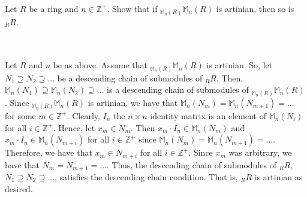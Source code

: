 Let $R$ be a ring and $n\in\mathbb{Z}^+$. Show that if $ _{\mathbb{M}_n(R)}\mathbb{M}_n(R)$ is
artinian, then so is $ _RR$.\\\\

\begin{solution}\renewcommand{\qedsymbol}{}\ \\
    Let $R$ and $n$ be as above. Assume that $ _{\mathbb{M}_n(R)}\mathbb{M}_n(R)$ is artinian. So, let
    $N_1\supseteq N_2\supseteq\ldots$ be a descending chain of submodules of $ _RR$. Then,
    $\mathbb{M}_n(N_1)\supseteq\mathbb{M}_n(N_2)\supseteq\ldots$ is a descending chain of submodules of
    $ _{\mathbb{M}_n(R)}\mathbb{M}_n(R)$. Since $ _{\mathbb{M}_n(R)}\mathbb{M}_n(R)$ is artinian, we
    have that $\mathbb{M}_n(N_m)=\mathbb{M}_n(N_{m+1})=\ldots$ for some $m\in\mathbb{Z}^+$. Clearly,
    $I_n$ the $n\times n$ identity matrix is an element of $\mathbb{M}_n(N_i)$ for all
    $i\in\mathbb{Z}^+$. Hence, let $x_m\in N_m$. Then $x_m\cdot I_n\in\mathbb{M}_n(N_m)$ and
    $x_m\cdot I_n\in\mathbb{M}_n(N_{m+i})$ for all $i\in\mathbb{Z}^+$ since
    $\mathbb{M}_n(N_m)=\mathbb{M}_n(N_{m+1})=\ldots$. Therefore, we have that $x_m\in N_{m+i}$ for all
    $i\in\mathbb{Z}^+$. Since $x_m$ was arbitrary, we have that $N_m=N_{m+1}=\ldots$. Thus, the
    descending chain of submodules of $ _RR$, $N_1\supseteq N_2\supseteq\ldots$, satisfies the
    descending chain condition. That is, $ _RR$ is artinian as desired. 

\end{solution}
